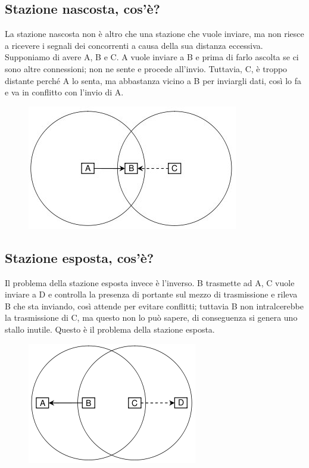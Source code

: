 \subsection{Stazione nascosta, cos'è?}
La stazione nascosta non è altro che una stazione che vuole inviare, ma non riesce a ricevere i segnali dei concorrenti a causa della sua distanza eccessiva. Supponiamo di avere A, B e C. A vuole inviare a B e prima di farlo ascolta se ci sono altre connessioni; non ne sente e procede all'invio. Tuttavia, C, è troppo distante perché A lo senta, ma abbastanza vicino a B per inviargli dati, così lo fa e va in conflitto con l'invio di A.

\begin{figure}[H]
\centering
\includegraphics[scale=0.6]{res/img/30_StazioneNascosta.png}
\end{figure} 

\subsection{Stazione esposta, cos'è?}

Il problema della stazione esposta invece è l'inverso. B trasmette ad A, C vuole inviare a D e controlla la presenza di portante sul mezzo di trasmissione e rileva B che sta inviando, così attende per evitare conflitti; tuttavia B non intralcerebbe la trasmissione di C, ma questo non lo può sapere, di conseguenza si genera uno stallo inutile. Questo è il problema della stazione esposta.
 
 \begin{figure}[H]
\centering
\includegraphics[scale=0.6]{res/img/30_StazioneEsposta.png}
\end{figure} 
